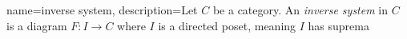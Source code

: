 {
  name=inverse system,
  description={Let $C$ be a category. An \textit{inverse system} in $C$ is  a diagram $F: I \to C$ where $I$ is a directed poset, meaning $I$ has suprema}
}